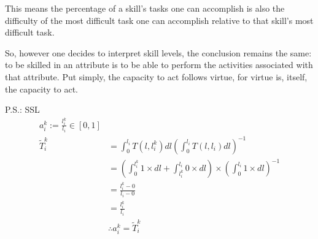 \documentclass[hidelinks, nonatbib]{elsarticle}
\begin{document}
\begin{definition}[Skill]
    This means the percentage of a skill's tasks one can accomplish is also
    the difficulty of the most difficult task one can accomplish relative to that
    skill's most difficult task.

    So, however one decides to interpret skill levels, the conclusion remains the
    same: to be skilled in an attribute is to be able to perform the activities
    associated with that attribute. Put simply, the capacity to act follows virtue,
    for virtue is, itself, the capacity to act.
\end{definition}

P.S.: SSL
\begin{align}
    a_{i}^{k} := \frac{l_{i}^{k}}{l_{i}} \in [0,1]
    \\
    \tilde{T}_{i}^{k} 
    &= 
    \int_{0}^{l_i}{
        T(l,l_{i}^{k})
        dl
    }
    \left(
        \int_{0}^{l_i}{
            T(l,l_{i})
            dl
        }
    \right) ^ {-1}
    \\
    &= 
    \left(
        \int_{0}^{l_{i}^{k}}{
            1
            \times
            dl
        }
        +
        \int_{l_{i}^{k}}^{l_i}{
            0
            \times
            dl
        }
    \right)
    \times
    \left(
        \int_{0}^{l_i}{
            1
            \times
            dl
        }
    \right) ^ {-1}
    \\
    &= 
    \frac{l_{i}^{k} - 0}{l_{i} - 0}
    \\
    &= 
    \frac{l_{i}^{k}}{l_{i}}
    \\
    &\therefore
    a_{i}^{k} = \tilde{T}_{i}^{k}
\end{align}
\end{document}
